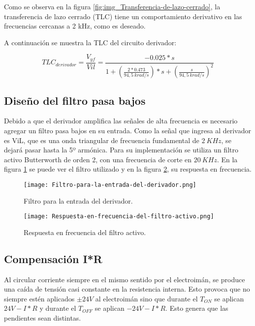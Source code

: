 \noindent Como se observa en la figura \ref{fig:img_Transferencia-de-lazo-cerrado}, la transferencia de lazo cerrado (TLC) tiene un comportamiento derivativo en las frecuencias cercanas a 2 kHz, como es deseado.

\noindent A continuaci\'{o}n se muestra la TLC del circuito derivador:
 
\begin{equation} \label{eq_Vyf-lineal}
	{TLC}_{derivador}=\frac{V_{yf}}{Vil}=\frac{-0.025*s}{1+(\frac{2*0.473}{94,5\ krad/s})*s+(\frac{s}{94,5\ krad/s})^2}
\end{equation} 

\subsection{Dise\~{n}o del filtro pasa bajos}

\noindent Debido a que el derivador amplifica las se\~{n}ales de alta frecuencia es necesario agregar un filtro pasa bajos en su entrada. Como la se\~{n}al que ingresa al derivador es ViL, que es una onda triangular de frecuencia fundamental de $2\:KHz$, se dejar\'{a} pasar hasta la 5º arm\'{o}nica. Para su implementaci\'{o}n se utiliza un filtro activo Butterworth de orden 2, con una frecuencia de corte en $20\:KHz$. En la figura  \ref{fig:img_Filtro-para-la-entrada-del-derivador} se puede ver el filtro utilizado y en la figura \ref{fig:img_Respuesta-en-frecuencia-del-filtro-activo}, su respuesta en frecuencia.

\begin{figure}[H]
	\centering
	\texttt{[image: Filtro-para-la-entrada-del-derivador.png]}
	\caption{Filtro para la entrada del derivador.}
	\label{fig:img_Filtro-para-la-entrada-del-derivador}
\end{figure}

\begin{figure}[H]
	\centering
	\texttt{[image: Respuesta-en-frecuencia-del-filtro-activo.png]}
	\caption{Respuesta en frecuencia del filtro activo.}
	\label{fig:img_Respuesta-en-frecuencia-del-filtro-activo}
\end{figure}

\subsection{Compensaci\'{o}n I*R}

\noindent Al circular corriente siempre en el mismo sentido por el electroim\'{a}n, se produce una ca\'{i}da de tensi\'{o}n casi constante en la resistencia interna. Esto provoca que no siempre est\'{e}n aplicados $\pm 24V$ al electroim\'{a}n sino que durante el $T_{ON}$ se aplican $24V-I*R$ y durante el $T_{OFF}$ se aplican $-24V-I*R$. Esto genera que las pendientes sean distintas.


